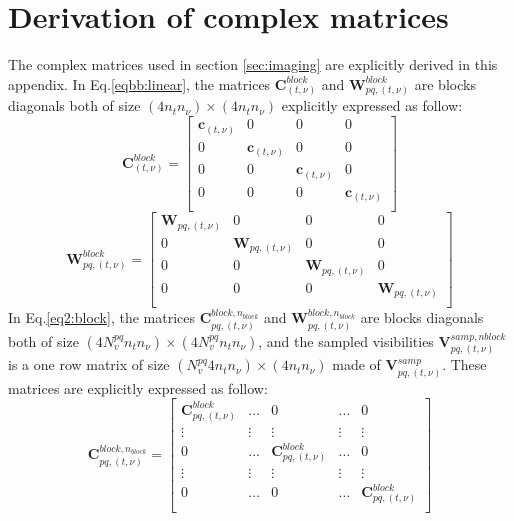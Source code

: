 \documentclass[useAMS,usenatbib]{mn2e}
\begin{document}
\section[]{Derivation of complex matrices}
\label{app:complexmatrices}
The complex matrices used in section \ref{sec:imaging} are explicitly derived in this appendix. In Eq.\ref{eqbb:linear}, the matrices
$\mathbf{C}_{(t,\nu)}^{block}$ and $\mathbf{W}_{pq,(t,\nu)}^{block}$ are blocks diagonals  both of size $(4n_t n_{\nu})\times(4n_t 
n_{\nu})$ explicitly expressed as follow:
\begin{equation*}
\mathbf{C}_{(t,\nu)}^{block}=
  \begin{bmatrix}
    \mathbf{c}_{(t,\nu)} & 0 & 0 & 0\\
    0 &  \mathbf{c}_{(t,\nu)} &0 & 0 \\
    0 & 0 & \mathbf{c}_{(t,\nu)} & 0\\
      0 & 0 & 0 & \mathbf{c}_{(t,\nu)}\\
  \end{bmatrix}
\end{equation*}
\begin{equation*}
\mathbf{W}_{pq,(t,\nu)}^{block}=
  \begin{bmatrix}
    \mathbf{W}_{pq,(t,\nu)}& 0 & 0 & 0\\
    0 &  \mathbf{W}_{pq,(t,\nu)} &0 & 0 \\
    0 & 0 & \mathbf{W}_{pq,(t,\nu)} & 0\\
      0 & 0 & 0 & \mathbf{W}_{pq,(t,\nu)}\\
  \end{bmatrix}
\end{equation*}
In Eq.\ref{eq2:block}, the matrices $\mathbf{C}_{pq,(t,\nu)}^{block,n_{block}}$ and 
$\mathbf{W}_{pq,(t,\nu)}^{block,n_{block}}$ are blocks diagonals both of size $(4N_v^{pq}n_t n_{\nu})\times (4N_v^{pq}n_t n_{\nu})$, and 
the sampled visibilities $\mathbf{V}_{pq,(t,\nu)}^{samp,nblock}$ is a one row matrix of size $(N_v^{pq}4 n_t n_{\nu})\times (4 n_t 
n_{\nu})$ 
made of $\textbf{V}_{pq,(t,\nu)}^{samp}$. These matrices are explicitly expressed as follow:
\begin{equation*}
\mathbf{C}_{pq,(t,\nu)}^{block,n_{block}}=
  \begin{bmatrix}
    \mathbf{C}_{pq,(t,\nu)}^{block} &\dots & 0 & \dots & 0\\
    \vdots & \vdots & \vdots & \vdots & \vdots\\
    0 & \dots& \mathbf{C}_{pq,(t,\nu)}^{block} &\dots & 0\\
    \vdots & \vdots & \vdots & \vdots & \vdots \\
    0 & \dots& 0 &\dots & \mathbf{C}_{pq,(t,\nu)}^{block}\\
  \end{bmatrix}
\end{equation*}
\end{document}
